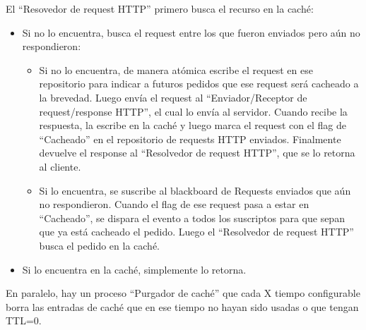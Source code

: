 El ``Resovedor de request HTTP'' primero busca el recurso en la caché:
\begin{itemize}
	\item Si no lo encuentra, busca el request entre los que fueron enviados pero aún no respondieron:
	\begin{itemize}
		\item Si no lo encuentra, de manera atómica escribe el request en ese repositorio para indicar a futuros
        pedidos que ese request será cacheado a la brevedad. Luego envía el request al ``Enviador/Receptor de
        request/response HTTP'', el cual lo envía al servidor. Cuando recibe la respuesta, la escribe en la caché
        y luego marca el request con el flag de ``Cacheado'' en el repositorio de requests HTTP enviados. Finalmente
        devuelve el response al ``Resolvedor de request HTTP'', que se lo retorna al cliente.
        
        \item Si lo encuentra, se suscribe al blackboard de Requests enviados que aún no respondieron.
        Cuando el flag de ese request pasa a estar en ``Cacheado'', se dispara el evento
        a todos los suscriptos para que sepan que ya está cacheado el pedido. Luego el ``Resolvedor de
        request HTTP'' busca el pedido en la caché.
	\end{itemize}
	
	\item  Si lo encuentra en la caché, simplemente lo retorna.
\end{itemize}

En paralelo, hay un proceso ``Purgador de caché'' que cada X tiempo configurable borra las entradas
de caché que en ese tiempo no hayan sido usadas o que tengan TTL=0.
